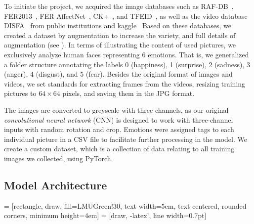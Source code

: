 To initiate the project, %
we acquired the image databases such as RAF-DB~\cite{li_reliable_2017,li2019reliable}, 
FER2013~\cite{BarsoumZCZ16}, FER AffectNet~\cite{Mollah2019ANet}, 
CK+~\cite{LuceyCKSAM10}, and TFEID~\cite{tfeid,LiGL22}, 
as well as the video database DISFA~\cite{MavadatiMBTC13} from public institutions and kaggle~\cite{kaggle_rafdb,kagaff}
Based on these databases, we created a dataset by augmentation to increase the variety, 
and full details of augmentation (see ). 
In terms of illustrating the content of used pictures, we exclusively analyze human faces representing 6 emotions. 
That is, 
we generalized a folder structure annotating the labels 0 (happiness), 1 (surprise), 2 (sadness), 3 (anger), 4 (disgust), and 5 (fear). 
Besides the original format of images and videos, we set standards for extracting frames from the videos, 
resizing training pictures to $64\times 64$ pixels, and saving them in the JPG format.

The images are converted to greyscale with three channels, 
as our original \textit{convolutional neural network} (CNN) is designed to work with three-channel inputs with random rotation and crop. 
Emotions were assigned tags to each individual picture in a CSV file to facilitate further processing in the model.
We create a custom dataset, which is a collection of data relating to all training images we collected, 
using PyTorch.

\subsection{Model Architecture}
\label{sec:setup:model}

 = [rectangle, draw, fill=LMUGreen!30, text width=5em, text centered, rounded corners, minimum height=4em]
 = [draw, -latex', line width=0.7pt]

